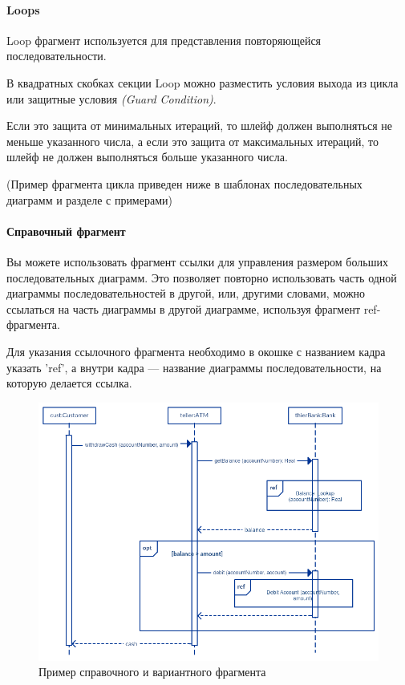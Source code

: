 \documentclass[a4paper,12pt]{extreport}
\begin{document}
\paragraph{Loops}

Loop фрагмент используется для представления повторяющейся последовательности.

В квадратных скобках секции Loop можно разместить условия выхода из цикла или защитные условия \textit{(Guard Condition)}. 

Если это защита от минимальных итераций, то шлейф должен выполняться не меньше указанного числа, а если это защита от максимальных итераций, то шлейф не должен выполняться больше указанного числа.

(Пример фрагмента цикла приведен ниже в шаблонах последовательных диаграмм и разделе с примерами)

\paragraph{Справочный фрагмент}

Вы можете использовать фрагмент ссылки для управления размером больших последовательных диаграмм. Это позволяет повторно использовать часть одной диаграммы последовательностей в другой, или, другими словами, можно ссылаться на часть диаграммы в другой диаграмме, используя фрагмент ref-фрагмента.

Для указания ссылочного фрагмента необходимо в окошке с названием кадра указать 'ref', а внутри кадра --- название диаграммы последовательности, на которую делается ссылка.

\begin{figure}[h!]
	\centering
	\includegraphics[width=0.6\linewidth]{images/frameoptref}
	\caption{Пример справочного и вариантного фрагмента}
	\label{fig:frameoptref}
\end{figure}
\end{document}
